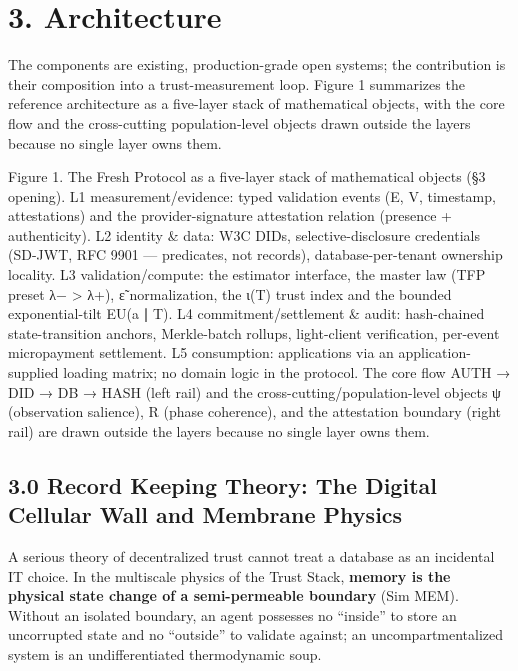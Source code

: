 \documentclass[
]{article}
\begin{document}
\section{3. Architecture}\label{architecture}

The components are existing, production-grade open systems; the
contribution is their composition into a trust-measurement loop. Figure
1 summarizes the reference architecture as a five-layer stack of
mathematical objects, with the core flow and the cross-cutting
population-level objects drawn outside the layers because no single
layer owns them.

Figure 1. The Fresh Protocol as a five-layer stack of mathematical
objects (§3 opening). L1 measurement/evidence: typed validation events
({E}, {V}, timestamp, attestations) and the provider-signature
attestation relation (presence + authenticity). L2 identity \& data: W3C
DIDs, selective-disclosure credentials (SD-JWT, RFC 9901 --- predicates,
not records), database-per-tenant ownership locality. L3
validation/compute: the estimator interface, the master law (TFP preset
{λ− \textgreater{} λ+}), {ε̃} normalization, the {ι(T)} trust index and
the bounded exponential-tilt {EU(a ∣ T)}. L4 commitment/settlement \&
audit: hash-chained state-transition anchors, Merkle-batch rollups,
light-client verification, per-event micropayment settlement. L5
consumption: applications via an application-supplied loading matrix; no
domain logic in the protocol. The core flow AUTH {→} DID {→} DB {→} HASH
(left rail) and the cross-cutting/population-level objects {ψ}
(observation salience), {R} (phase coherence), and the attestation
boundary (right rail) are drawn outside the layers because no single
layer owns them.

\subsection{3.0 Record Keeping Theory: The Digital Cellular Wall and
Membrane
Physics}\label{record-keeping-theory-the-digital-cellular-wall-and-membrane-physics}

A serious theory of decentralized trust cannot treat a database as an
incidental IT choice. In the multiscale physics of the Trust Stack,
\textbf{memory is the physical state change of a semi-permeable
boundary} (Sim MEM). Without an isolated boundary, an agent possesses no
``inside'' to store an uncorrupted state and no ``outside'' to validate
against; an uncompartmentalized system is an undifferentiated
thermodynamic soup.
\end{document}

